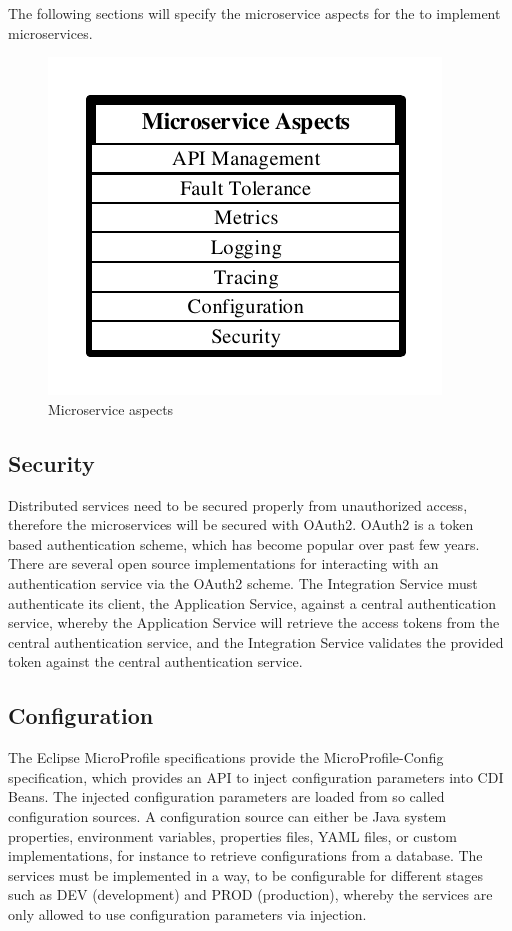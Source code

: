 The following sections will specify the microservice aspects for the to implement microservices. 
\newpage

\begin{figure}[htbp]
	\centering
	\includegraphics[scale=1]{images/esboc-requirement-services.pdf}
	\caption{Microservice aspects}
	\label{fig:esboc-aspects}
\end{figure} 

\subsection{Security}
\label{sec:esboc-aspects-security}
Distributed services need to be secured properly from unauthorized access, therefore the microservices will be secured with OAuth2. OAuth2 is a token based authentication scheme, which has become popular over past few years. There are several open source implementations for interacting with an authentication service via the OAuth2 scheme. The Integration Service must authenticate its client, the Application Service, against a central authentication service, whereby the Application Service will retrieve the access tokens from the central authentication service, and the Integration Service validates the provided token against the central authentication service\cite{OAuth2018}.

\subsection{Configuration}
\label{sec:esboc-aspects-config}
The Eclipse MicroProfile specifications provide the MicroProfile-Config specification, which provides an API to inject configuration parameters into CDI Beans. The injected configuration parameters are loaded from so called configuration sources. A configuration source can either be Java system properties, environment variables, properties files, YAML files, or custom implementations, for instance to retrieve configurations from a database. The services must be implemented in a way, to be configurable for different stages such as DEV (development) and PROD (production), whereby  the services are only allowed to use configuration parameters via injection\cite{EclipseMicroprofileConfig2018}.

